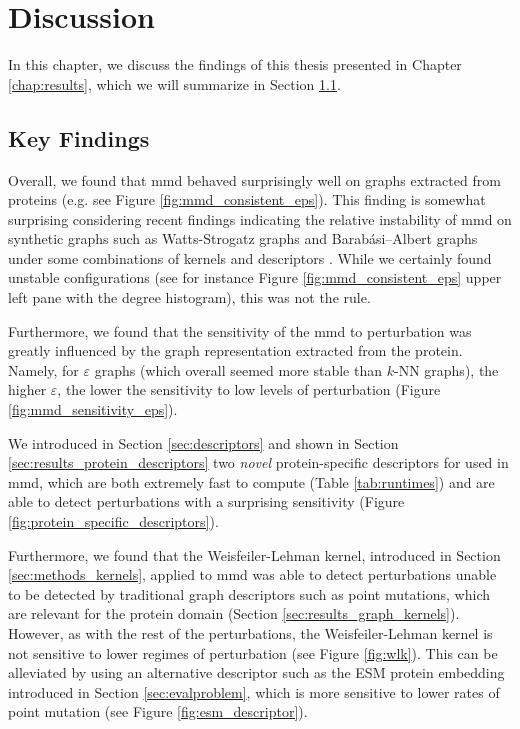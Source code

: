 \chapter{Discussion}\label{chap:discussion}

In this chapter, we discuss the findings of this thesis presented in Chapter
\ref{chap:results}, which we will summarize in Section \ref{sec:key_findings}.

\section{Key Findings}\label{sec:key_findings}

Overall, we found that \acrshort{mmd} behaved surprisingly well on graphs extracted from
proteins (e.g. see Figure \ref{fig:mmd_consistent_eps}). This finding is
somewhat surprising considering recent findings indicating the relative
instability of \acrshort{mmd} on synthetic graphs such as Watts-Strogatz graphs and
Barabási–Albert graphs under some combinations of kernels and descriptors
\citep{o2021evaluation}. While we certainly found unstable configurations
(see for instance Figure \ref{fig:mmd_consistent_eps} upper left pane with the degree histogram),
this was not the rule.

Furthermore, we found that the sensitivity of the \acrshort{mmd} to perturbation was
greatly influenced by the graph representation extracted from the protein.
Namely, for $\varepsilon$ graphs (which overall seemed more stable than $k$-NN
graphs), the higher $\varepsilon$, the lower the sensitivity to low levels of
perturbation (Figure \ref{fig:mmd_sensitivity_eps}).

We introduced in Section \ref{sec:descriptors} and shown in Section
\ref{sec:results_protein_descriptors} two \emph{novel} protein-specific descriptors for
used in \acrshort{mmd}, which are both extremely fast to compute (Table \ref{tab:runtimes})
and are able to detect perturbations with a surprising sensitivity (Figure
\ref{fig:protein_specific_descriptors}).

Furthermore, we found that the Weisfeiler-Lehman kernel, introduced in Section
\ref{sec:methods_kernels}, applied to \acrshort{mmd} was able to detect perturbations
unable to be detected by traditional graph descriptors such as point mutations,
which are relevant for the protein domain (Section
\ref{sec:results_graph_kernels}). However, as with the rest of the perturbations,
the Weisfeiler-Lehman kernel is not sensitive to lower regimes of perturbation
(see Figure \ref{fig:wlk}).
This can be alleviated by using an alternative descriptor such as the ESM
protein embedding introduced in Section \ref{sec:evalproblem}, which is more
sensitive to lower rates of point mutation (see Figure
\ref{fig:esm_descriptor}).


